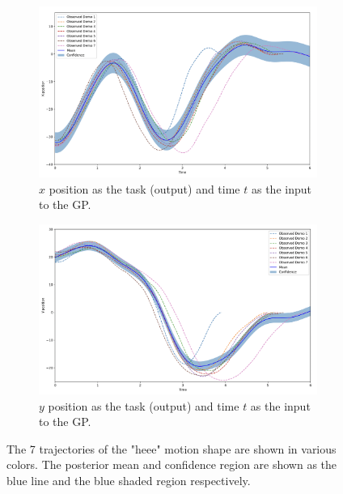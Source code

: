 \begin{figure}[h!]
	\captionsetup{font=footnotesize}
	\centering

	\begin{subfigure}{0.45\textwidth}
		\label{fig:atlasrobot}
	    \includegraphics[width=\textwidth]{paper/images/X_time_Exact_GP_RBF.png}
		\caption{$x$ position as the task (output) and time $t$ as the input to the GP.}
	\end{subfigure}
	\begin{subfigure}{0.45\textwidth}
		\label{fig:atlas_traj_example}
		\includegraphics[width=\textwidth]{paper/images/Y_Time_Exact_GP.png}
		\caption{$y$ position as the task (output) and time $t$ as the input to the GP.}
	\end{subfigure}
	
	\caption{The 7 trajectories of the "heee" motion shape are shown in various colors. The posterior mean and confidence region are shown as the blue line and the blue shaded region respectively.}

    \label{fig:scalar_exact}

    \vspace{-2em}
\end{figure}

